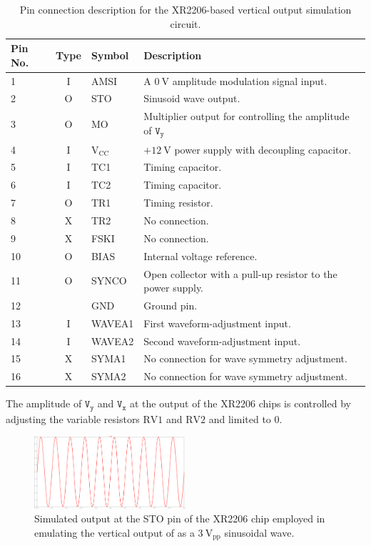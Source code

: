 \documentclass[class=report,11pt,crop=false]{standalone}
\begin{document}
	\begin{table}[ht!]
		\caption{Pin connection description for the XR2206-based vertical output simulation circuit.}
		\label{tab:voec-pin-description}
		\centering
		\begin{tabular}{|m{3em}|c|m{10em}|m{18em}|}
			\hline
			\cellcolor{cyan!25}\textbf{Pin No.} & \cellcolor{cyan!25}\textbf{Type}	& \cellcolor{cyan!25}\textbf{Symbol} & \cellcolor{cyan!25}\textbf{Description} \\
			\hline
			1	&	I	& AMSI 	& A $\SI{0}{\volt}$ amplitude modulation signal input.\\
			\hline
			2	&   O	& STO	&	Sinusoid wave output.\\
			\hline
			3	& 	O	& MO	&	Multiplier output for controlling the amplitude of $\texttt{V}_\texttt{y}$\\
			\hline
			4	& 	I	& $\text{V}_{\text{CC}}$ & $+\SI{12}{\volt}$ power supply with decoupling capacitor.\\
			\hline
			5	& 	I	& TC1	&	Timing capacitor.\\
			\hline
			6	&	I	& TC2	& 	Timing capacitor.\\
			\hline
			7	&	O	& TR1	&	Timing resistor.\\
			\hline
			8	&	X	& TR2	&	 No connection.\\
			\hline
			9	&	X	& FSKI	&	No connection.\\  
			\hline
			10	&	O	& BIAS	&	 Internal voltage reference.\\
			\hline
			11	&	O	& SYNCO	&	 Open collector with a pull-up resistor to the power
			supply.\\
			\hline
			12	& 		& GND		& Ground pin.\\
			\hline
			13	&	I	& WAVEA1	&	 First waveform-adjustment input.\\
			\hline
			14	&	I	& WAVEA2	&	Second waveform-adjustment input.\\
			\hline
			15	&	X	& SYMA1		&	 No connection for wave symmetry adjustment.\\
			\hline
			16	&	X	& SYMA2		&	 No connection for wave symmetry adjustment.\\
			\hline
		\end{tabular}
	\end{table}
	The amplitude of $\texttt{V}_\texttt{y}$ and $\texttt{V}_\texttt{x}$ at the output of the XR2206 chips is controlled by adjusting the variable resistors $\text{RV1}$ and $\text{RV2}$ and limited to $0$.
	\begin{figure}[ht!]
		\centering
		\includegraphics[width=0.50\textwidth]{Figures/Methodology/emulator-vertical-output-sinewave}
		\caption{Simulated output at the STO pin of the XR2206 chip employed in emulating the vertical output of as a $3~\text{V}_\text{pp}$ sinusoidal wave.}
		\label{fig:emulator-vertical-output-sinewave}
	\end{figure}
\end{document}
